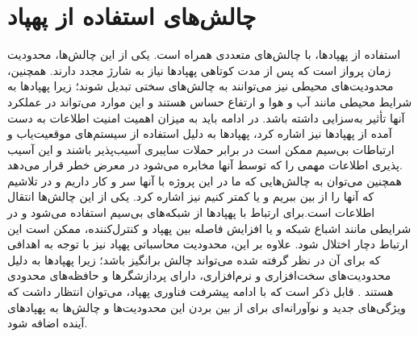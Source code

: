  \section{چالش‌های استفاده از پهپاد}
 استفاده از پهپادها، با چالش‌های متعددی همراه است. یکی از این چالش‌ها، محدودیت زمان پرواز است که پس از مدت کوتاهی پهپاد‌ها نیاز به شارژ مجدد دارند. 
 همچنین، محدودیت‌های محیطی نیز می‌توانند به چالش‌های سختی تبدیل شوند؛ زیرا پهپادها به شرایط محیطی مانند آب و هوا و ارتفاع حساس هستند و این موارد می‌تواند 
 در عملکرد آنها تأثیر به‌سزایی داشته باشد. در ادامه باید به میزان اهمیت امنیت اطلاعات به دست آمده از پهپاد‌ها نیز اشاره کرد، پهپادها به دلیل استفاده از سیستم‌های موقعیت‌یاب و ارتباطات بی‌سیم ممکن 
 است در برابر حملات سایبری آسیب‌پذیر باشند و این آسیب پذیری اطلاعات مهمی را که توسط آنها مخابره می‌شود در معرض خطر قرار می‌دهد.
 \\
 همچنین می‌توان به چالش‌هایی که ما در این پروژه با آنها سر و کار داریم و در تلاشیم که آنها را از بین ببریم و یا کمتر کنیم نیز اشاره کرد. 
   یکی از این چالش‌ها انتقال اطلاعات است.برای ارتباط با پهپادها از شبکه‌های بی‌سیم استفاده می‌شود و در شرایطی مانند اشباع شبکه  و یا افزایش فاصله بین پهپاد و کنترل‌کننده، ممکن است این ارتباط دچار اختلال شود.
 علاوه بر این، محدودیت محاسباتی پهپاد نیز با توجه به اهدافی که برای آن در نظر گرفته شده می‌تواند چالش برانگیز باشد؛ زیرا پهپادها به دلیل محدودیت‌های سخت‌افزاری و نرم‌افزاری، دارای پردازشگرها و حافظه‌های محدودی هستند \cite{hassanalian2017classifications}.
 قابل ذکر است که با ادامه پیشرفت فناوری پهپاد، می‌توان انتظار داشت که ویژگی‌های جدید و نوآورانه‌ای برای از بین بردن این محدودیت‌ها و چالش‌ها به‌ پهپادهای آینده اضافه شود.



